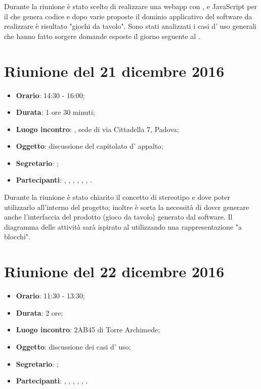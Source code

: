 Durante la riunione è stato scelto di realizzare una webapp con , e JavaScript per il  che genera codice  e dopo varie proposte il dominio applicativo del software da realizzare è risultato "giochi da tavolo". 
Sono stati analizzati i casi d' uso generali che hanno fatto sorgere domande esposte il giorno seguente al \GP.



\section{Riunione del 21 dicembre 2016}

\begin{itemize}
	\item \textbf{Orario}: 14:30 - 16:00;
	\item \textbf{Durata}: 1 ore 30 minuti;
	\item \textbf{Luogo incontro}: \ZU, sede di via Cittadella 7, Padova; 
	\item \textbf{Oggetto}: discussione del capitolato d' appalto;
	\item \textbf{Segretario}: \AZ; 
	\item \textbf{Partecipanti}: \GP, \AZ, \GG, \LB, \LS, \MM, \PB.
\end{itemize}

Durante la riunione è stato chiarito il concetto di stereotipo e dove poter utilizzarlo all'interno del progetto; inoltre è sorta la necessità di dover generare anche l'interfaccia del prodotto (gioco da tavolo) generato dal software. Il diagramma delle attività sarà ispirato al  utilizzando una rappresentazione "a blocchi".



\section{Riunione del 22 dicembre 2016}

\begin{itemize}
	\item \textbf{Orario}: 11:30 - 13:30;
	\item \textbf{Durata}: 2 ore;
	\item \textbf{Luogo incontro}: 2AB45 di Torre Archimede; 
	\item \textbf{Oggetto}: discussione dei casi d' uso;
	\item \textbf{Segretario}: \PB; 
	\item \textbf{Partecipanti}: \AZ, \GG, \LB, \LS, \MM, \PB.
\end{itemize}

